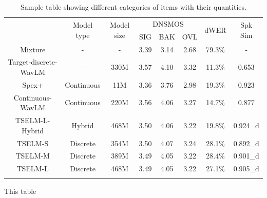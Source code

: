\documentclass[conference]{IEEEtran}
\begin{document}
\begin{table}
    \setlength{\tabcolsep}{12pt} %
    \renewcommand{\arraystretch}{1.3}
    \begin{center}
        \begin{tabular}{cccccccc}
            \Xhline{2\arrayrulewidth} %
            \multirow{2}{*}{System} & \multirow{2}{*}{Model type} & \multirow{2}{*}{Model size} & \multicolumn{3}{c}{DNSMOS} & \multirow{2}{*}{dWER} & \multirow{2}{*}{Spk Sim} \\
                                    &                             &                             & SIG     & BAK     & OVL    &                       &                          \\
            \hline
            Mixture                 & -                           & -                           & 3.39    & 3.14    & 2.68   & 79.3\%                & -                        \\
            Target-discrete-WavLM   & -                           & 330M                           & 3.57    & 4.10    & 3.32   & 11.3\%                & 0.653                    \\
            \hline
            Spex+                   & Continuous                  & 11M                         & 3.36    & 3.76    & 2.98   & 19.3\%                & 0.923                    \\
            \hline
            Continuous-WavLM       & Continuous                  & 220M                        & 3.56    & 4.06    & 3.27   & 14.7\%                & 0.877                    \\
            TSELM-L-Hybrid          & Hybrid                      & 468M                        & 3.50    & 4.06    & 3.22   & 19.8\%                & 0.924\_d                 \\
            \hline
            TSELM-S                 & Discrete                    & 354M                        & 3.50    & 4.07    & 3.24   & 28.1\%                & 0.892\_d                 \\
            TSELM-M                 & Discrete                    & 389M                        & 3.49    & 4.05    & 3.22   & 28.4\%                & 0.901\_d                 \\
            TSELM-L                 & Discrete                    & 468M                        & 3.49    & 4.05    & 3.22   & 27.1\%                & 0.905\_d \\
            \Xhline{2\arrayrulewidth} %
            \end{tabular}
            \linebreak
            \caption{Sample table showing different categories of items with their quantities.}
            \label{main_exp}
            This table 
      \end{center}
      
  \end{table}
\end{document}
